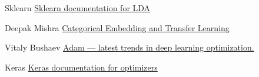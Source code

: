 \documentclass{article}
\begin{document}
\begin{thebibliography}{1}
Sklearn
\newblock\href{https://scikit-learn.org/stable/modules/generated/sklearn.discriminant_analysis.LinearDiscriminantAnalysis.html}{Sklearn documentation for LDA}

Deepak Mishra
\newblock\href{https://towardsdatascience.com/categorical-embedding-and-transfer-learning-dd3c4af6345d}{Categorical Embedding and Transfer Learning}

Vitaly Bushaev
\newblock\href{https://towardsdatascience.com/adam-latest-trends-in-deep-learning-optimization-6be9a291375c}{Adam — latest trends in deep learning optimization.
}

Keras
\newblock\href{https://keras.io/optimizers/}{Keras documentation for optimizers}


\end{thebibliography}
\end{document}
